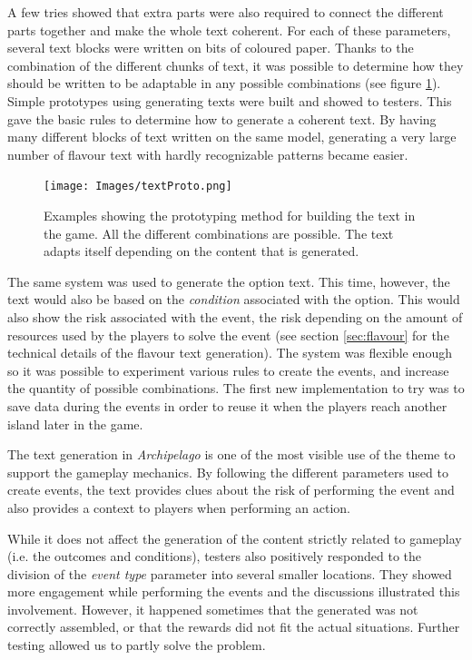 A few tries showed that extra parts were also required to connect the different parts together and make the whole text coherent. For each of these parameters, several text blocks were written on bits of coloured paper. Thanks to the combination of the different chunks of text, it was possible to determine how they should be written to be adaptable in any possible combinations (see figure \ref{fig:textproto}). Simple prototypes using generating texts were built and showed to testers. This gave the basic rules to determine how to generate a coherent text. By having many different blocks of text written on the same model, generating a very large number of flavour text with hardly recognizable patterns became easier. 

\begin{figure}[!ht]
    \centering
    \texttt{[image: Images/textProto.png]}
    \caption{Examples showing the prototyping method for building the text in the game. All the different combinations are possible. The text adapts itself depending on the content that is generated.}
    \label{fig:textproto}
\end{figure}

The same system was used to generate the option text. This time, however, the text would also be based on the \textit{condition} associated with the option. This would also show the risk associated with the event, the risk depending on the amount of resources used by the players to solve the event (see section \ref{sec:flavour} for the technical details of the flavour text generation). The system was flexible enough so it was possible to experiment various rules to create the events, and increase the quantity of possible combinations. The first new implementation to try was to save data during the events in order to reuse it when the players reach another island later in the game.

The text generation in \textit{Archipelago} is one of the most visible use of the theme to support the gameplay mechanics. By following the different parameters used to create events, the text provides clues about the risk of performing the event and also provides a context to players when performing an action.

While it does not affect the generation of the content strictly related to gameplay (i.e. the outcomes and conditions), testers also positively responded to the division of the \textit{event type} parameter into several smaller locations. They showed more engagement while performing the events and the discussions illustrated this involvement. However, it happened sometimes that the generated was not correctly assembled, or that the rewards did not fit the actual situations. Further testing allowed us to partly solve the problem.
